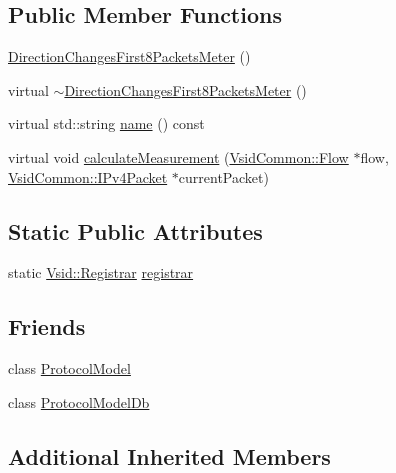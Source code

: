 \subsection*{Public Member Functions}
\begin{DoxyCompactItemize}
\item 
\hyperlink{class_vsid_1_1_direction_changes_first8_packets_meter_a08ef93ea92fe912df456453b2b6dea57}{Direction\-Changes\-First8\-Packets\-Meter} ()
\item 
virtual \hyperlink{class_vsid_1_1_direction_changes_first8_packets_meter_a6b7e6b8d8d04a1bf40bf422f84d1149a}{$\sim$\-Direction\-Changes\-First8\-Packets\-Meter} ()
\item 
virtual std\-::string \hyperlink{class_vsid_1_1_direction_changes_first8_packets_meter_a14276ee9ec9c10f80e10ea49e2d8aa27}{name} () const 
\item 
virtual void \hyperlink{class_vsid_1_1_direction_changes_first8_packets_meter_ac156207e2c465f3f8b982e07d7ea99a0}{calculate\-Measurement} (\hyperlink{class_vsid_common_1_1_flow}{Vsid\-Common\-::\-Flow} $\ast$flow, \hyperlink{class_vsid_common_1_1_i_pv4_packet}{Vsid\-Common\-::\-I\-Pv4\-Packet} $\ast$current\-Packet)
\end{DoxyCompactItemize}
\subsection*{Static Public Attributes}
\begin{DoxyCompactItemize}
\item 
static \hyperlink{class_vsid_1_1_registrar}{Vsid\-::\-Registrar} \hyperlink{class_vsid_1_1_direction_changes_first8_packets_meter_ada5677211397c9ef8177e2f5d7e8fa26}{registrar}
\end{DoxyCompactItemize}
\subsection*{Friends}
\begin{DoxyCompactItemize}
\item 
class \hyperlink{class_vsid_1_1_direction_changes_first8_packets_meter_a80219b863d4ff3456933d16bc5f73f45}{Protocol\-Model}
\item 
class \hyperlink{class_vsid_1_1_direction_changes_first8_packets_meter_a3c0d389e7a9476b06313d8fb9ca9fe68}{Protocol\-Model\-Db}
\end{DoxyCompactItemize}
\subsection*{Additional Inherited Members}


